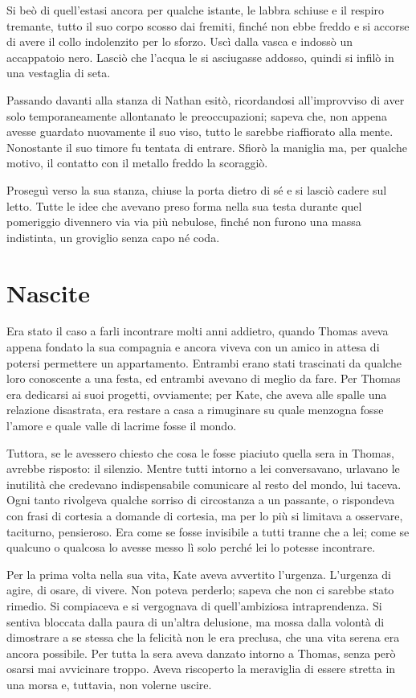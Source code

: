 \documentclass[a4paper,oneside,11pt]{memoir}
\begin{document}
Si beò di quell'estasi ancora per qualche istante, le labbra schiuse e il
respiro tremante, tutto il suo corpo scosso dai fremiti, finché non ebbe freddo
e si accorse di avere il collo indolenzito per lo sforzo. Uscì dalla vasca e
indossò un accappatoio nero. Lasciò che l'acqua le si asciugasse addosso, quindi
si infilò in una vestaglia di seta.

Passando davanti alla stanza di Nathan esitò, ricordandosi all'improvviso di
aver solo temporaneamente allontanato le preoccupazioni; sapeva che, non appena
avesse guardato nuovamente il suo viso, tutto le sarebbe riaffiorato alla mente.
Nonostante il suo timore fu tentata di entrare. Sfiorò la maniglia ma, per
qualche motivo, il contatto con il metallo freddo la scoraggiò.

Proseguì verso la sua stanza, chiuse la porta dietro di sé e si lasciò cadere
sul letto. Tutte le idee che avevano preso forma nella sua testa durante quel
pomeriggio divennero via via più nebulose, finché non furono una massa
indistinta, un groviglio senza capo né coda.

\chapter{Nascite}

Era stato il caso a farli incontrare molti anni addietro, quando Thomas aveva
appena fondato la sua compagnia e ancora viveva con un amico in attesa di
potersi permettere un appartamento. Entrambi erano stati trascinati da qualche
loro conoscente a una festa, ed entrambi avevano di meglio da fare. Per Thomas
era dedicarsi ai suoi progetti, ovviamente; per Kate, che aveva alle spalle una
relazione disastrata, era restare a casa a rimuginare su quale menzogna fosse
l'amore e quale valle di lacrime fosse il mondo.

Tuttora, se le avessero chiesto che cosa le fosse piaciuto quella sera in
Thomas, avrebbe risposto: il silenzio. Mentre tutti intorno a lei conversavano,
urlavano le inutilità che credevano indispensabile comunicare al resto del
mondo, lui taceva. Ogni tanto rivolgeva qualche sorriso di circostanza a un
passante, o rispondeva con frasi di cortesia a domande di cortesia, ma per lo
più si limitava a osservare, taciturno, pensieroso. Era come se fosse invisibile
a tutti tranne che a lei; come se qualcuno o qualcosa lo avesse messo lì solo
perché lei lo potesse incontrare.

Per la prima volta nella sua vita, Kate aveva avvertito l'urgenza. L'urgenza di
agire, di osare, di vivere. Non poteva perderlo; sapeva che non ci sarebbe stato
rimedio. Si compiaceva e si vergognava di quell'ambiziosa intraprendenza. Si
sentiva bloccata dalla paura di un'altra delusione, ma mossa dalla volontà di
dimostrare a se stessa che la felicità non le era preclusa, che una vita serena
era ancora possibile. Per tutta la sera aveva danzato intorno a Thomas, senza
però osarsi mai avvicinare troppo. Aveva riscoperto la meraviglia di essere
stretta in una morsa e, tuttavia, non volerne uscire.
\end{document}
